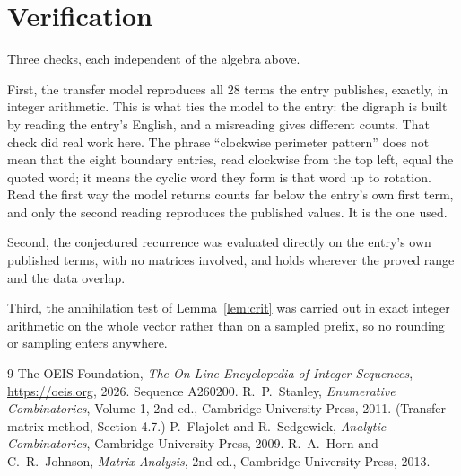 \documentclass[11pt,a4paper]{article}
\theoremstyle{plain}
\theoremstyle{definition}
\begin{document}
\section{Verification}

Three checks, each independent of the algebra above.

First, the transfer model reproduces all $28$ terms the entry publishes, exactly, in
integer arithmetic. This is what ties the model to the entry: the digraph is built by reading
the entry's English, and a misreading gives different counts. That check did real work here. The phrase ``clockwise perimeter pattern'' does not mean that the eight boundary entries, read clockwise from the top left, equal the quoted word; it means the cyclic word they form is that word up to rotation. Read the first way the model returns counts far below the entry's own first term, and only the second reading reproduces the published values. It is the one used.

Second, the conjectured recurrence was evaluated directly on the entry's own published terms,
with no matrices involved, and holds wherever the proved range and the data overlap.

Third, the annihilation test of Lemma~\ref{lem:crit} was carried out in exact integer
arithmetic on the whole vector rather than on a sampled prefix, so no rounding or sampling
enters anywhere.

\begin{thebibliography}{9}
 The OEIS Foundation, \emph{The On-Line Encyclopedia of Integer
Sequences}, \url{https://oeis.org}, 2026. Sequence A260200.
 R.~P.~Stanley, \emph{Enumerative Combinatorics}, Volume 1, 2nd ed.,
Cambridge University Press, 2011. (Transfer-matrix method, Section 4.7.)
 P.~Flajolet and R.~Sedgewick, \emph{Analytic Combinatorics}, Cambridge
University Press, 2009.
 R.~A.~Horn and C.~R.~Johnson, \emph{Matrix Analysis}, 2nd ed., Cambridge
University Press, 2013.
\end{thebibliography}
\end{document}
